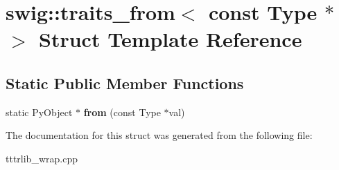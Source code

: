 \hypertarget{structswig_1_1traits__from_3_01const_01_type_01_5_01_4}{}\section{swig\+:\+:traits\+\_\+from$<$ const Type $\ast$ $>$ Struct Template Reference}
\label{structswig_1_1traits__from_3_01const_01_type_01_5_01_4}
\subsection*{Static Public Member Functions}
\begin{DoxyCompactItemize}
\item 
\mbox{\label{structswig_1_1traits__from_3_01const_01_type_01_5_01_4_ae36dbdb3c905af0dab508e7bf360a8d6}} 
static Py\+Object $\ast$ {\bfseries from} (const Type $\ast$val)
\end{DoxyCompactItemize}


The documentation for this struct was generated from the following file\+:\begin{DoxyCompactItemize}
\item 
tttrlib\+\_\+wrap.\+cpp\end{DoxyCompactItemize}

